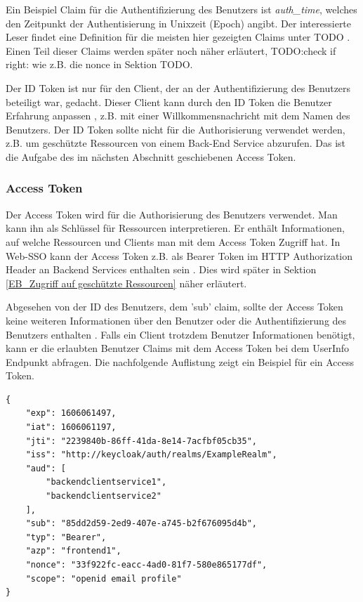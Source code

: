 Ein Beispiel Claim für die Authentifizierung des Benutzers ist \textit{auth\_time}, welches den Zeitpunkt der Authentisierung in Unixzeit (Epoch) angibt. Der interessierte Leser findet eine Definition für die meisten hier gezeigten Claims unter TODO \cite{EB7}. Einen Teil dieser Claims werden später noch näher erläutert, TODO:check if right: wie z.B. die nonce in Sektion TODO.

Der ID Token ist nur für den Client, der an der Authentifizierung des Benutzers beteiligt war, gedacht. Dieser Client kann durch den ID Token die Benutzer Erfahrung anpassen \cite{EB8}, z.B. mit einer Willkommensnachricht mit dem Namen des Benutzers. Der ID Token sollte nicht für die Authorisierung verwendet werden, z.B. um geschützte Ressourcen von einem Back-End Service abzurufen. Das ist die Aufgabe des im nächsten Abschnitt geschiebenen Access Token.

\subsubsection{Access Token} \label{EB_AccessToken}

Der Access Token wird für die Authorisierung des Benutzers verwendet. Man kann ihn als Schlüssel für Ressourcen interpretieren. Er enthält Informationen, auf welche Ressourcen und Clients man mit dem Access Token Zugriff hat. In Web-SSO kann der Access Token z.B. als Bearer Token im HTTP Authorization Header an Backend Services enthalten sein \cite{EB27}. Dies wird später in Sektion \ref{EB_Zugriff auf geschützte Ressourcen} näher erläutert.

Abgesehen von der ID des Benutzers, dem 'sub' claim, sollte der Access Token keine weiteren Informationen über den Benutzer oder die Authentifizierung des Benutzers enthalten \cite{EB7}. Falls ein Client trotzdem Benutzer Informationen benötigt, kann er die erlaubten Benutzer Claims mit dem Access Token bei dem UserInfo Endpunkt abfragen. Die nachfolgende Auflistung zeigt ein Beispiel für ein Access Token.

\begin{lstlisting}[caption=Beispiel Access Token, captionpos=b]
{
	"exp": 1606061497,
	"iat": 1606061197,
	"jti": "2239840b-86ff-41da-8e14-7acfbf05cb35",
	"iss": "http://keycloak/auth/realms/ExampleRealm",
	"aud": [
		"backendclientservice1",
		"backendclientservice2"
	],
	"sub": "85dd2d59-2ed9-407e-a745-b2f676095d4b",
	"typ": "Bearer",
	"azp": "frontend1",
	"nonce": "33f922fc-eacc-4ad0-81f7-580e865177df",
	"scope": "openid email profile"
}
\end{lstlisting}

